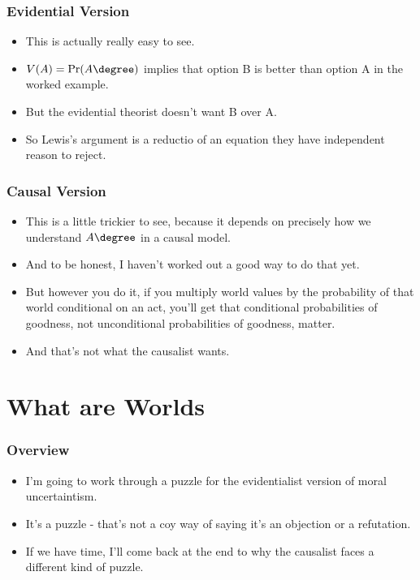 \begin{frame}[fragile]
\frametitle{Evidential Version}
\label{evidentialversion}

\begin{itemize}
\item{} This is actually really easy to see.

\item{} $V(A) = \Pr(A\degree)$ implies that option B is better than option A in the worked example.

\item{} But the evidential theorist doesn't want B over A.

\item{} So Lewis's argument is a reductio of an equation they have independent reason to reject.

\end{itemize}

\end{frame}

\begin{frame}[fragile]
\frametitle{Causal Version}
\label{causalversion}

\begin{itemize}
\item{} This is a little trickier to see, because it depends on precisely how we understand $A\degree$ in a causal model.

\item{} And to be honest, I haven't worked out a good way to do that yet.

\item{} But however you do it, if you multiply world values by the probability of that world conditional on an act, you'll get that conditional probabilities of goodness, not unconditional probabilities of goodness, matter.

\item{} And that's not what the causalist wants.

\end{itemize}

\end{frame}

\section{What are Worlds}
\label{whatareworlds}

\begin{frame}[fragile]
\frametitle{Overview}
\label{overview}

\begin{itemize}
\item{} I'm going to work through a puzzle for the evidentialist version of moral uncertaintism.

\item{} It's a puzzle - that's not a coy way of saying it's an objection or a refutation.

\item{} If we have time, I'll come back at the end to why the causalist faces a different kind of puzzle.

\end{itemize}

\end{frame}


